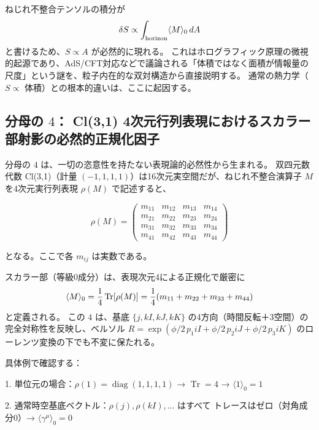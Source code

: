 \documentclass[dvipdfmx,a4paper]{jsbook}
\theoremstyle{definition}
\theoremstyle{remark}
\begin{document}
ねじれ不整合テンソルの積分が
\begin{equation}
  \delta S \propto \int_{\rm horizon} \langle M \rangle_0 \, dA
\end{equation}
と書けるため、$S \propto A$ が必然的に現れる。  
これはホログラフィック原理の微視的起源であり、AdS/CFT対応などで議論される「体積ではなく面積が情報量の尺度」という謎を、粒子内在的な双対構造から直接説明する。  
通常の熱力学（$S \propto$ 体積）との根本的違いは、ここに起因する。

\subsection{分母の $4$： Cl(3,1) 4次元行列表現におけるスカラー部射影の必然的正規化因子}

分母の $4$ は、一切の恣意性を持たない表現論的必然性から生まれる。  
双四元数代数 Cl(3,1)（計量 $(-1,1,1,1)$）は16次元実空間だが、ねじれ不整合演算子 $M$ を4次元実行列表現 $\rho(M)$ で記述すると、

\begin{equation}
  \rho(M) =
  \begin{pmatrix}
    m_{11} & m_{12} & m_{13} & m_{14} \\
    m_{21} & m_{22} & m_{23} & m_{24} \\
    m_{31} & m_{32} & m_{33} & m_{34} \\
    m_{41} & m_{42} & m_{43} & m_{44}
  \end{pmatrix}
\end{equation}

となる。ここで各 $m_{ij}$ は実数である。

スカラー部（等級0成分）は、表現次元4による正規化で厳密に
\begin{equation}
  \langle M \rangle_0 = \frac{1}{4} \, {\rm Tr}[\rho(M)] = \frac{1}{4} (m_{11} + m_{22} + m_{33} + m_{44})
  \label{eq:scalar-projection-exact}
\end{equation}
と定義される。  
この $4$ は、基底 $\{j, kI, kJ, kK\}$ の4方向（時間反転＋3空間）の完全対称性を反映し、ベルソル $R = \exp(\phi/2 \, p_1 iI + \phi/2 \, p_2 iJ + \phi/2 \, p_3 iK)$ のローレンツ変換の下でも不変に保たれる。

具体例で確認する：

1. 単位元の場合：$\rho(1) = \operatorname{diag}(1,1,1,1)$ → $\operatorname{Tr}=4$ → $\langle 1 \rangle_0 = 1$

2. 通常時空基底ベクトル：$\rho(j), \rho(kI), \dots$ はすべて トレースはゼロ（対角成分0）→ $\langle \gamma^\mu \rangle_0 = 0$
\end{document}

